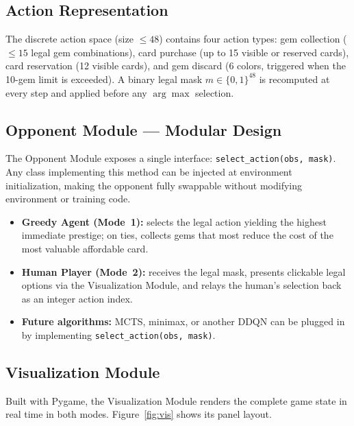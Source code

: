 \documentclass[11pt]{article}
\begin{document}
\subsection{Action Representation}
The discrete action space (size $\leq 48$) contains four action types: gem collection
($\leq 15$ legal gem combinations), card purchase (up to 15 visible or reserved cards),
card reservation (12 visible cards), and gem discard (6 colors, triggered when the 10-gem
limit is exceeded). A binary legal mask $m \in \{0,1\}^{48}$ is recomputed at every step
and applied before any $\arg\max$ selection.

\subsection{Opponent Module — Modular Design}
The Opponent Module exposes a single interface: \texttt{select\_action(obs,\,mask)}.
Any class implementing this method can be injected at environment initialization, making
the opponent fully swappable without modifying environment or training code.

\begin{itemize}
  \item \textbf{Greedy Agent (Mode~1):} selects the legal action yielding
        the highest immediate prestige; on ties, collects gems that most reduce the
        cost of the most valuable affordable card.
  \item \textbf{Human Player (Mode~2):} receives the legal mask, presents clickable
        legal options via the Visualization Module, and relays the human's selection
        back as an integer action index.
  \item \textbf{Future algorithms:} MCTS, minimax, or another DDQN can be plugged in
        by implementing \texttt{select\_action(obs,\,mask)}.
\end{itemize}

\subsection{Visualization Module}
Built with Pygame, the Visualization Module renders the complete game state in real time in
both modes. Figure~\ref{fig:vis} shows its panel layout.
\end{document}
